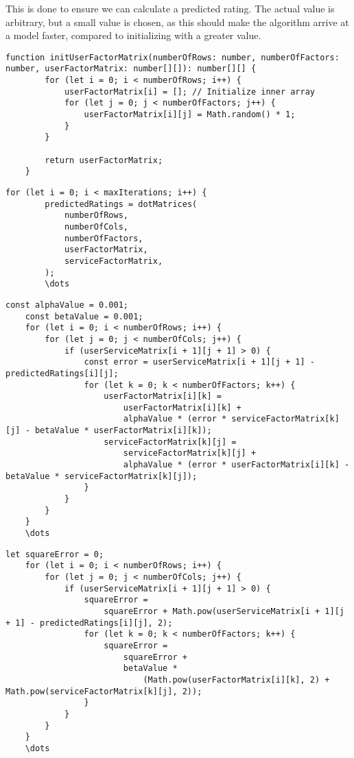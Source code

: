This is done to ensure we can calculate a predicted rating.
The actual value is arbitrary, but a small value is chosen, as this should make the algorithm arrive at a model faster, compared to initializing with a greater value.
\begin{lstlisting}[caption={Initializing the user and factor matrix}, captionpos=b, label={lst:initUserFactor}]
    function initUserFactorMatrix(numberOfRows: number, numberOfFactors: number, userFactorMatrix: number[][]): number[][] {
        for (let i = 0; i < numberOfRows; i++) {
            userFactorMatrix[i] = []; // Initialize inner array
            for (let j = 0; j < numberOfFactors; j++) {
                userFactorMatrix[i][j] = Math.random() * 1;
            }
        }
    
        return userFactorMatrix;
    }
\end{lstlisting}

\begin{lstlisting}[caption={}, captionpos=b, label={}]
    for (let i = 0; i < maxIterations; i++) {
        predictedRatings = dotMatrices(
            numberOfRows,
            numberOfCols,
            numberOfFactors,
            userFactorMatrix,
            serviceFactorMatrix,
        );
        \dots
\end{lstlisting}

\begin{lstlisting}[caption={}, captionpos=b, label={}]
    const alphaValue = 0.001;
    const betaValue = 0.001;
    for (let i = 0; i < numberOfRows; i++) {
        for (let j = 0; j < numberOfCols; j++) {
            if (userServiceMatrix[i + 1][j + 1] > 0) {
                const error = userServiceMatrix[i + 1][j + 1] - predictedRatings[i][j];
                for (let k = 0; k < numberOfFactors; k++) {
                    userFactorMatrix[i][k] =
                        userFactorMatrix[i][k] +
                        alphaValue * (error * serviceFactorMatrix[k][j] - betaValue * userFactorMatrix[i][k]);
                    serviceFactorMatrix[k][j] =
                        serviceFactorMatrix[k][j] +
                        alphaValue * (error * userFactorMatrix[i][k] - betaValue * serviceFactorMatrix[k][j]);
                }
            }
        }
    }
    \dots
\end{lstlisting}

\begin{lstlisting}[caption={}, captionpos=b, label={}]
    let squareError = 0;
    for (let i = 0; i < numberOfRows; i++) {
        for (let j = 0; j < numberOfCols; j++) {
            if (userServiceMatrix[i + 1][j + 1] > 0) {
                squareError =
                    squareError + Math.pow(userServiceMatrix[i + 1][j + 1] - predictedRatings[i][j], 2);
                for (let k = 0; k < numberOfFactors; k++) {
                    squareError =
                        squareError +
                        betaValue *
                            (Math.pow(userFactorMatrix[i][k], 2) + Math.pow(serviceFactorMatrix[k][j], 2));
                }
            }
        }
    }
    \dots
\end{lstlisting}


